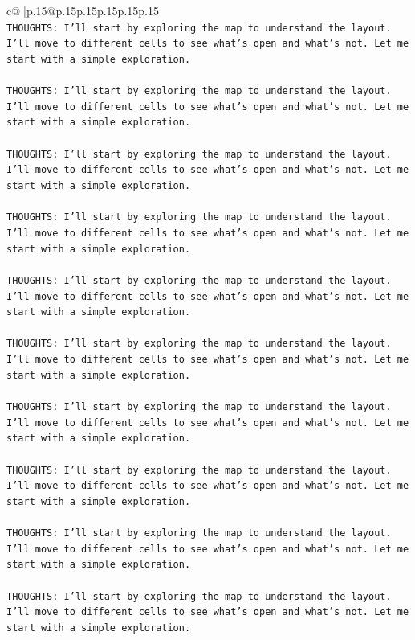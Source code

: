 \documentclass{article}
\begin{document}
{\begin{supertabular}{c@{$\;$}|p{.15\linewidth}@{}p{.15\linewidth}p{.15\linewidth}p{.15\linewidth}p{.15\linewidth}p{.15\linewidth}}
{{{\\ 
\texttt{THOUGHTS: I'll start by exploring the map to understand the layout. I'll move to different cells to see what's open and what's not. Let me start with a simple exploration.} \\
\\ 
\texttt{THOUGHTS: I'll start by exploring the map to understand the layout. I'll move to different cells to see what's open and what's not. Let me start with a simple exploration.} \\
\\ 
\texttt{THOUGHTS: I'll start by exploring the map to understand the layout. I'll move to different cells to see what's open and what's not. Let me start with a simple exploration.} \\
\\ 
\texttt{THOUGHTS: I'll start by exploring the map to understand the layout. I'll move to different cells to see what's open and what's not. Let me start with a simple exploration.} \\
\\ 
\texttt{THOUGHTS: I'll start by exploring the map to understand the layout. I'll move to different cells to see what's open and what's not. Let me start with a simple exploration.} \\
\\ 
\texttt{THOUGHTS: I'll start by exploring the map to understand the layout. I'll move to different cells to see what's open and what's not. Let me start with a simple exploration.} \\
\\ 
\texttt{THOUGHTS: I'll start by exploring the map to understand the layout. I'll move to different cells to see what's open and what's not. Let me start with a simple exploration.} \\
\\ 
\texttt{THOUGHTS: I'll start by exploring the map to understand the layout. I'll move to different cells to see what's open and what's not. Let me start with a simple exploration.} \\
\\ 
\texttt{THOUGHTS: I'll start by exploring the map to understand the layout. I'll move to different cells to see what's open and what's not. Let me start with a simple exploration.} \\
\\ 
\texttt{THOUGHTS: I'll start by exploring the map to understand the layout. I'll move to different cells to see what's open and what's not. Let me start with a simple exploration.} \\
}}}
\end{supertabular}}
\end{document}
